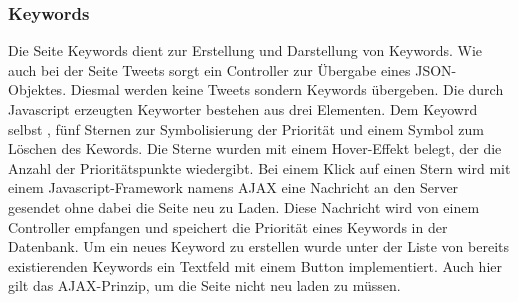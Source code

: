 \subsubsection*{Keywords}
Die Seite Keywords dient zur Erstellung und Darstellung von Keywords. Wie auch bei der Seite Tweets 
sorgt ein Controller zur Übergabe eines JSON-Objektes. Diesmal werden keine Tweets sondern Keywords 
übergeben. Die durch Javascript erzeugten Keyworter bestehen aus drei Elementen. Dem Keyowrd selbst , 
fünf Sternen zur Symbolisierung  der Priorität und einem Symbol zum Löschen des Kewords. Die Sterne 
wurden mit einem Hover-Effekt belegt, der die Anzahl der Prioritätspunkte wiedergibt. Bei einem Klick 
auf einen Stern wird mit einem Javascript-Framework namens AJAX eine Nachricht an den Server gesendet 
ohne dabei die Seite neu zu Laden. Diese Nachricht wird von einem Controller empfangen und speichert 
die Priorität eines Keywords in der Datenbank. Um ein neues Keyword zu erstellen wurde unter der Liste 
von bereits existierenden Keywords ein Textfeld mit einem Button implementiert. Auch hier gilt das 
AJAX-Prinzip, um die Seite nicht neu laden zu müssen.
